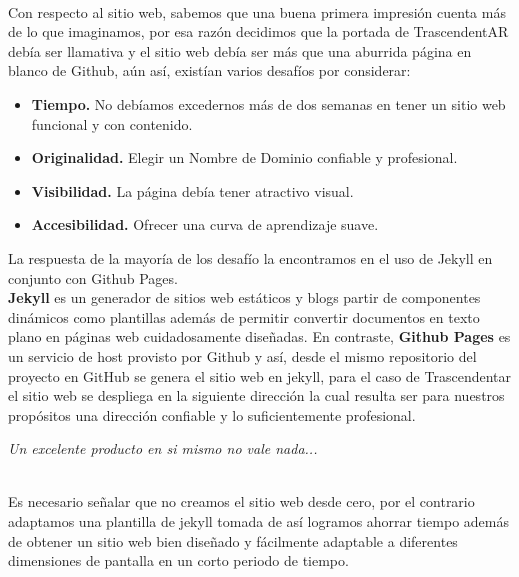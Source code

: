 \begin{multicols}{2}

\\
Con respecto al sitio web, sabemos que una buena primera impresión cuenta más de lo que imaginamos, por esa razón decidimos que la portada de TrascendentAR debía ser llamativa y el sitio web debía ser más que una aburrida página en blanco de Github, aún así, existían varios desafíos por considerar:

\begin{itemize}
    \item \textbf {Tiempo.} No debíamos excedernos más de dos semanas en tener un sitio web funcional y con contenido.
    \item \textbf {Originalidad.} Elegir un Nombre de Dominio confiable y profesional.
    \item \textbf {Visibilidad.} La página debía tener atractivo visual.
    \item \textbf {Accesibilidad.} Ofrecer una curva de aprendizaje suave.
    
\end{itemize}

La respuesta de la mayoría de los desafío la encontramos en el uso de Jekyll en conjunto con Github Pages.
\\

\textbf {Jekyll} es un generador de sitios web estáticos y blogs partir de componentes dinámicos como plantillas además de permitir convertir documentos en texto plano en páginas web cuidadosamente diseñadas. En contraste, \textbf {Github Pages} es un servicio de host provisto por Github y así, desde el mismo repositorio del proyecto en GitHub se genera el sitio web en jekyll, para el caso de Trascendentar el sitio web se despliega en la siguiente dirección  {\color{introcolor}{glud.github.io/trascendentAR}} la cual resulta ser para nuestros propósitos una dirección confiable y lo suficientemente profesional.
\\ 
\begin{entradilla}
{\em Un excelente producto en si mismo no vale nada... {\color{introcolor}{si nadie lo conoce}} }
\end{entradilla}
\\

Es necesario señalar que no creamos el sitio web desde cero, por el contrario adaptamos una plantilla de jekyll tomada de {\color{introcolor}{www.jekyllthemes.org}} así logramos ahorrar tiempo además de obtener un sitio web bien diseñado y fácilmente adaptable a diferentes dimensiones de pantalla en un corto periodo de tiempo. 
\\


\end{multicols}
